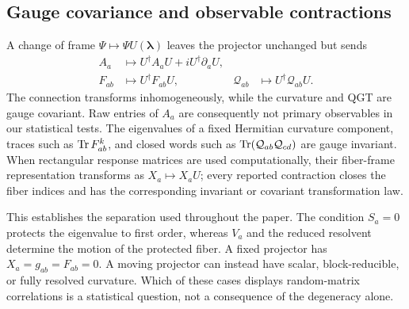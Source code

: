 \subsection{Gauge covariance and observable contractions}

A change of frame $\Psi\mapsto\Psi U(\boldsymbol\lambda)$ leaves the projector
unchanged but sends
\begin{align}
 A_a&\mapsto U^\dagger A_aU+iU^\dagger\partial_aU,\nonumber\\
 F_{ab}&\mapsto U^\dagger F_{ab}U,
 &\mathcal Q_{ab}&\mapsto U^\dagger\mathcal Q_{ab}U.
\end{align}
The connection transforms inhomogeneously, while the curvature and QGT are
gauge covariant.  Raw entries of $A_a$ are consequently not primary
observables in our statistical tests.  The eigenvalues of a fixed Hermitian
curvature component, traces such as $\operatorname{Tr} F_{ab}^k$, and closed words such as
$\operatorname{Tr}(\mathcal Q_{ab}\mathcal Q_{cd})$ are gauge invariant.  When rectangular
response matrices are used computationally, their fiber-frame representation
transforms as $X_a\mapsto X_aU$; every reported contraction closes the fiber
indices and has the corresponding invariant or covariant transformation law.

This establishes the separation used throughout the paper.  The condition
$S_a=0$ protects the eigenvalue to first order, whereas $V_a$ and the reduced
resolvent determine the motion of the protected fiber.  A fixed projector has
$X_a=g_{ab}=F_{ab}=0$.  A moving projector can instead have scalar,
block-reducible, or fully resolved curvature.  Which of these cases displays
random-matrix correlations is a statistical question, not a consequence of
the degeneracy alone.
